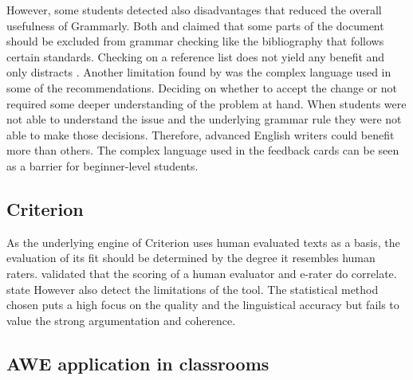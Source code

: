 \documentclass[runningheads]{llncs}
\let\OldTextregistered\textregistered
\renewcommand{\textregistered}{\OldTextregistered\xspace}%
\begin{document}
However, some students detected also disadvantages that reduced the overall usefulness of Grammarly\textregistered. Both \citeauthor{ventayen_graduate_2018} and  \citeauthor{nova_utilizing_2018} claimed that some parts of the document should be excluded from grammar checking like the bibliography that follows certain standards. Checking on a reference list does not yield any benefit and only distracts \citep{ventayen_graduate_2018, nova_utilizing_2018}. Another limitation found by \textcite{cavaleri_you_2016} was the complex language used in some of the recommendations. Deciding on whether to accept the change or not required some deeper understanding of the problem at hand. When students were not able to understand the issue and the underlying grammar rule they were not able to make those decisions. Therefore, advanced English writers could benefit more than others. The complex language used in the feedback cards can be seen as a barrier for beginner-level students. 

\subsection{Criterion\textregistered}
As the underlying engine of Criterion\textregistered uses human evaluated texts as a basis, the evaluation of its fit should be determined by the degree it resembles human raters. \textcite{weigle_validation_2010} validated that the scoring of a human evaluator and e-rater\textregistered do correlate. \citeauthor{lim_review_2012} state  However \textcite{lim_review_2012} also detect the limitations of the tool. The statistical method chosen puts a high focus on the quality and the linguistical accuracy but fails to value the strong argumentation and coherence. 

\subsection{AWE application in classrooms}
\end{document}
